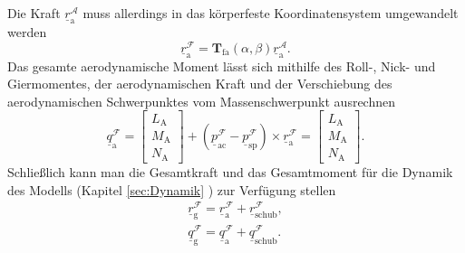 Die Kraft $\underline{r}^\mathcal{A}_\mathrm{a}$ muss allerdings in das körperfeste Koordinatensystem umgewandelt werden
\begin{equation}
\underline{r}^\mathcal{F}_\mathrm{a} = \textbf{T}_\mathrm{fa}(\alpha,\beta)\underline{r}^\mathcal{A}_\mathrm{a}.
\end{equation}
Das gesamte aerodynamische Moment lässt sich mithilfe des Roll-, Nick- und Giermomentes, der aerodynamischen Kraft und der Verschiebung des aerodynamischen Schwerpunktes vom Massenschwerpunkt ausrechnen \cite{RAMYoutube_Playlist}
\begin{equation}
\underline{q}^\mathcal{F}_\mathrm{a} = \begin{bmatrix} 
L_\mathrm{A}\\
M_\mathrm{A}\\
N_\mathrm{A}
\end{bmatrix} + (\underline{p}_\mathrm{ac}^\mathcal{F}-\underline{p}_\mathrm{sp}^\mathcal{F})\times\underline{r}^\mathcal{F}_\mathrm{a} = \begin{bmatrix} 
L_\mathrm{A}\\
M_\mathrm{A}\\
N_\mathrm{A}
\end{bmatrix}.
\end{equation}
Schlie{\ss}lich kann man die Gesamtkraft und das Gesamtmoment für die Dynamik des Modells (Kapitel \ref{sec:Dynamik} ) zur Verfügung stellen
\begin{align}
\underline{r}^\mathcal{F}_\mathrm{g} = \underline{r}^\mathcal{F}_\mathrm{a} + \underline{r}^\mathcal{F}_\mathrm{schub},\\
\underline{q}^\mathcal{F}_\mathrm{g} = \underline{q}^\mathcal{F}_\mathrm{a} + \underline{q}^\mathcal{F}_\mathrm{schub}.
\end{align}

